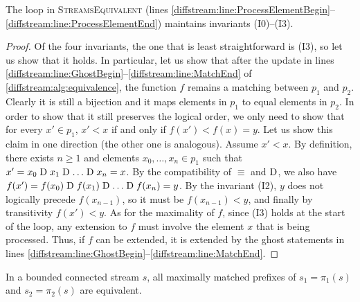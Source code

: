 \begin{lemma}
  The loop in \textsc{StreamsEquivalent} (lines \ref{diffstream:line:ProcessElementBegin}--\ref{diffstream:line:ProcessElementEnd}) maintains invariants (I0)--(I3).
\end{lemma}

\begin{proof}
  Of the four invariants,
  the one that is least straightforward is (I3), so let us show that it
  holds. In particular, let us show that after the update in lines
  \ref{diffstream:line:GhostBegin}--\ref{diffstream:line:MatchEnd} of \cref{diffstream:alg:equivalence}, the function $f$
  remains a matching between $p_1$ and $p_2$. Clearly it is still a
  bijection and it maps elements in $p_1$ to equal elements in $p_2$. In
  order to show that it still preserves the logical order, we only need
  to show that for every $x'\in p_1$, $x'<x$ if and only if
  $f(x')<f(x)=y$. Let us show this claim in one direction (the other one
  is analogous).  Assume $x'<x$. By definition, there exists $n\geq 1$
  and elements $x_0, \ldots, x_n\in p_1$ such that $x'=x_0 \mathrel{\mathrm{D}} x_1 \mathrel{\mathrm{D}}
  \ldots \mathrel{\mathrm{D}} x_n=x$.  By the compatibility of $\equiv$ and $\mathrel{\mathrm{D}}$, we
  also have $f(x')=f(x_0) \mathrel{\mathrm{D}} f(x_1) \mathrel{\mathrm{D}} \ldots \mathrel{\mathrm{D}} f(x_n)=y$. By the
  invariant (I2), $y$ does not logically precede $f(x_{n-1})$, so it
  must be $f(x_{n-1})<y$, and finally by transitivity $f(x')<y$. As for
  the maximality of $f$, since (I3) holds at the start of the loop, any extension to $f$ must involve the element $x$ that is
  being processed. Thus, if $f$ can be extended, it is extended by the
  ghost statements in lines \ref{diffstream:line:GhostBegin}--\ref{diffstream:line:MatchEnd}.
\end{proof}

\begin{lemma}\label{diffstream:lem:maximal-prefixes}
  In a bounded connected stream $s$, all maximally matched prefixes
  of $s_1=\pi_1(s)$ and $s_2=\pi_2(s)$ are equivalent.
\end{lemma}

